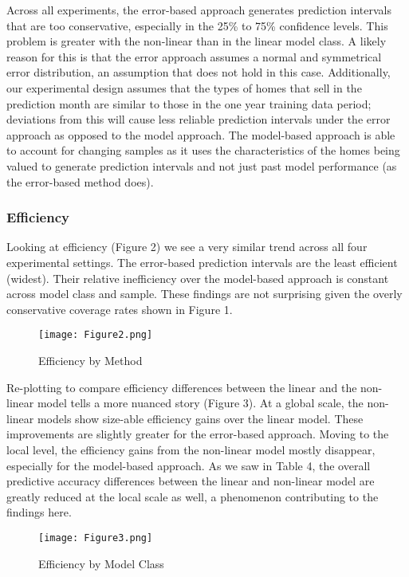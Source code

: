 \documentclass[colTwo]{format}
\theoremstyle{definition}
\begin{document}
Across all experiments, the error-based approach generates prediction intervals that are too conservative, especially in the 25\% to 75\% confidence levels.  This problem is greater with the non-linear than in the linear model class.  A likely reason for this is that the error approach assumes a normal and symmetrical error distribution, an assumption that does not hold in this case.  Additionally, our experimental design assumes that the types of homes that sell in the prediction month are similar to those in the one year training data period; deviations from this will cause less reliable prediction intervals under the error approach as opposed to the model approach.  The model-based approach is able to account for changing samples as it uses the characteristics of the homes being valued to generate prediction intervals and not just past model performance (as the error-based method does). 

\subsubsection{Efficiency}

Looking at efficiency (Figure 2) we see a very similar trend across all four experimental settings.  The error-based prediction intervals are the least efficient (widest). Their relative inefficiency over the model-based approach is constant across model class and sample. These findings are not surprising given the overly conservative coverage rates shown in Figure 1. 

\begin{figure}[h!]
\centering
\texttt{[image: Figure2.png]}
\caption{Efficiency by Method}
\label{fig:effm}
\end{figure}

Re-plotting to compare efficiency differences between the linear and the non-linear model tells a more nuanced story (Figure 3). At a global scale, the non-linear models show size-able efficiency gains over the linear model. These improvements are slightly greater for the error-based approach. Moving to the local level, the efficiency gains from the non-linear model mostly disappear, especially for the model-based approach. As we saw in Table 4, the overall predictive accuracy differences between the linear and non-linear model are greatly reduced at the local scale as well, a phenomenon contributing to the findings here. 

\begin{figure}[h!]
\centering
\texttt{[image: Figure3.png]}
\caption{Efficiency by Model Class}
\label{fig:effmc}
\end{figure}
\end{document}
